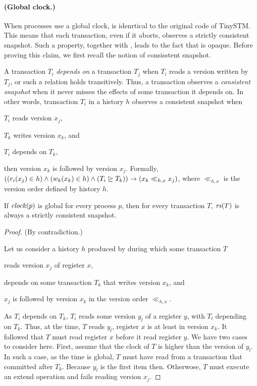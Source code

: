\paragraph{(Global clock.)}
When processes use a global clock,  is idenrtical to the original code of TinySTM.
This means that each transaction, even if it aborts, observes a strictly consistent snapshot.
Such a property, together with , leads to the fact that  is opaque.
Before proving this claim, we first recall the notion of consisstent snapshot.

A transaction $T_i$ \emph{depends on} a transaction $T_j$ when $T_i$ reads a version written by $T_j$, or such a relation holds transitively.
Thus, a transaction observes a \emph{consistent snapshot} \cite{Chan:1985} when it never misses the effects of some transaction it depends on.
In other words, transaction $T_i$ in a history $h$ observes a consistent snapshot when
\begin{inparaenum}[\em(i)]
\item $T_i$ reads version $x_j$,
\item $T_k$ writes version $x_k$, and 
\item $T_i$ depends on $T_{k}$,
\end{inparaenum}
then version $x_k$ is followed by version $x_j$.
Formally, $((r_i(x_j) \in h) \land (w_k(x_k) \in h) \land (T_i \depends T_k)) \implies (x_k \ll_{h,x} x_j)$, where $\ll_{h,x}$ is the version order defined by history $h$.

\begin{proposition}
  If $\clockOf{p}$ is global for every process $p$, then for every transaction $T$, $\readSetOf{T}$ is always a strictly consistent snapshot.
\end{proposition}

\begin{proof}
  (By contradiction.)
  
  Let us consider a history $h$ produced by  during which some transaction $T$
  \begin{inparaenum}[\em(i)]
  \item reads version $x_j$ of register $x$,
  \item depends on some transaction $T_k$ that writes version $x_k$, and
  \item $x_j$ is followed by version $x_k$ in the version order $\ll_{h,x}$.
  \end{inparaenum}

  As $T_i$ depends on $T_k$, $T_i$ reads some version $y_l$ of a register $y$, with $T_l$ depending on $T_k$.
  Thus, at the time, $T$ reads $y_l$, register $x$ is at least in version $x_k$.
  It followed that $T$ must read register $x$ before it read register $y$.
  We have two cases to consider here.
  First, assume that the clock of $T$ is higher than the version of $y_l$.
  In such a case, as the time is global, $T$ must have read from a transaction that committed after $T_k$.
  Because $y_l$ is the first item then.
  Otherwose, $T$ must execute an extend operation and fails reading version $x_j$.  
\end{proof}

